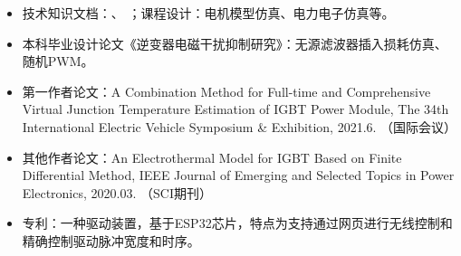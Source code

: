 \documentclass[zh]{resume}
\begin{document}
\begin{itemize}
  \item 技术知识文档：、
  ；课程设计：电机模型仿真、电力电子仿真等。
  \item 本科毕业设计论文《逆变器电磁干扰抑制研究》：无源滤波器插入损耗仿真、随机PWM。
  \item 第一作者论文：{\small A Combination Method for Full-time and Comprehensive Virtual Junction Temperature Estimation of IGBT Power Module, The 34th International Electric Vehicle Symposium \& Exhibition, 2021.6. （国际会议）}
  \item 其他作者论文：{\small An Electrothermal Model for IGBT Based on Finite Differential Method, IEEE Journal of Emerging and Selected Topics in Power Electronics, 2020.03. 
  （SCI期刊） }
  \item 专利：一种驱动装置，基于ESP32芯片，特点为支持通过网页进行无线控制和精确控制驱动脉冲宽度和时序。
\end{itemize}
\end{document}

